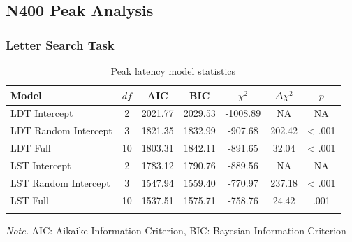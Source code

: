 \documentclass[english,man]{apa6}
\theoremstyle{definition}
\theoremstyle{definition}
\theoremstyle{definition}
\theoremstyle{remark}
\begin{document}
\subsection{N400 Peak Analysis}\label{n400-peak-analysis}

\subsubsection{Letter Search Task}\label{letter-search-task-1}

\begin{table}[tbp]
\begin{center}
\begin{threeparttable}
\caption{\label{tab:Peak-table-model}Peak latency model statistics}
\begin{tabular}{lcccccc}
\toprule
Model & $df$ & AIC & BIC & $\chi^2$ & $\Delta\chi^2$ & $p$\\
\midrule
LDT Intercept & 2 & 2021.77 & 2029.53 & -1008.89 & NA & NA\\
LDT Random Intercept & 3 & 1821.35 & 1832.99 & -907.68 & 202.42 & < .001\\
LDT Full & 10 & 1803.31 & 1842.11 & -891.65 & 32.04 & < .001\\
LST Intercept & 2 & 1783.12 & 1790.76 & -889.56 & NA & NA\\
LST Random Intercept & 3 & 1547.94 & 1559.40 & -770.97 & 237.18 & < .001\\
LST Full & 10 & 1537.51 & 1575.71 & -758.76 & 24.42 & .001\\
\bottomrule
\addlinespace
\end{tabular}
\begin{tablenotes}[para]
\textit{Note.} AIC: Aikaike Information Criterion, BIC: Bayesian Information Criterion
\end{tablenotes}
\end{threeparttable}
\end{center}
\end{table}
\end{document}
